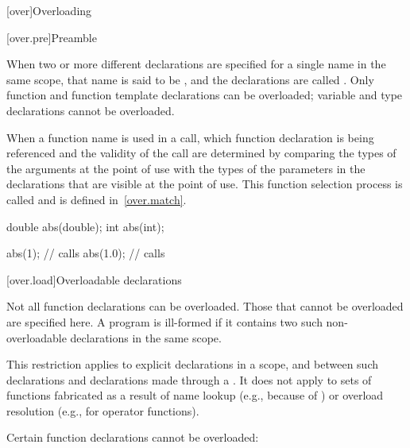 [over]{Overloading}%


[over.pre]{Preamble}

\pnum
{}%
%
When two or more different declarations are specified for a single name
in the same scope, that name is said to be
,
and the declarations
are called
.
Only function and function template
declarations can be overloaded; variable and type declarations
cannot be overloaded.

\pnum
When a function name is used in a call, which function
declaration is being referenced and the validity of the call
are determined by comparing the types
of the arguments at the point of use with the types of the parameters
in the declarations that are visible at the point of use.
This function selection process is called
 and is defined in~\ref{over.match}.
\begin{example}
%
\begin{codeblock}
double abs(double);
int abs(int);

abs(1);             // calls 
abs(1.0);           // calls 
\end{codeblock}
\end{example}

[over.load]{Overloadable declarations}
%

\pnum
{}%
Not all function declarations can be overloaded.
Those that cannot be
overloaded are specified here.
A program is ill-formed if it contains
two such non-overloadable declarations in the same scope.
\begin{note}
This restriction applies to explicit declarations in a scope, and between
such declarations and
declarations made through a
.
It does not apply to sets of functions fabricated as a result of
name lookup (e.g., because of
)
or overload resolution
(e.g., for operator functions).
\end{note}

\pnum
Certain function declarations cannot be overloaded:

